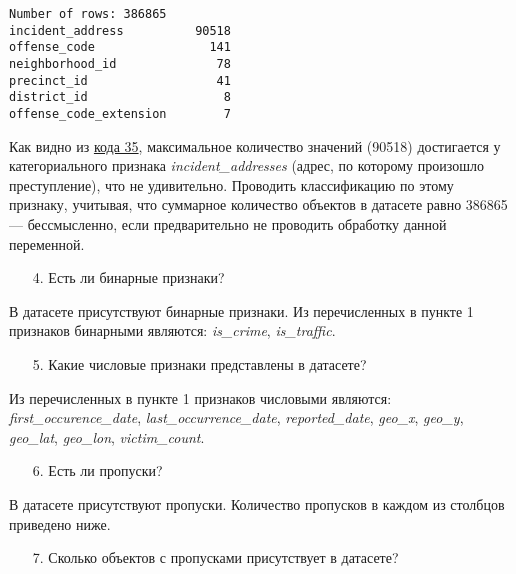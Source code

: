 \begin{code}
\begin{verbatim}
Number of rows: 386865
incident_address          90518
offense_code                141
neighborhood_id              78
precinct_id                  41
district_id                   8
offense_code_extension        7
\end{verbatim}
\label{code:35}
\end{code}

Как видно из \hyperref[code:35]{кода 35}, максимальное количество значений (90518) достигается у категориального признака \textit{incident\_addresses} (адрес, по которому произошло преступление), что не удивительно. Проводить классификацию по этому признаку, учитывая, что суммарное количество объектов в датасете равно 386865 --- бессмысленно, если предварительно не проводить обработку данной переменной.

\begin{enumerate}
    \item[4.] Есть ли бинарные признаки?
\end{enumerate}

В датасете присутствуют бинарные признаки. Из перечисленных в пункте 1 признаков бинарными являются: \textit{is\_crime}, \textit{is\_traffic}.

\begin{enumerate}
    \item[5.] Какие числовые признаки представлены в датасете?
\end{enumerate}

Из перечисленных в пункте 1 признаков числовыми являются: \textit{first\_occurence\_date}, \textit{last\_occurrence\_date}, \textit{reported\_date}, \textit{geo\_x}, \textit{geo\_y}, \textit{geo\_lat}, \textit{geo\_lon}, \textit{victim\_count}.

\begin{enumerate}
    \item[6.] Есть ли пропуски?
\end{enumerate}

В датасете присутствуют пропуски. Количество пропусков в каждом из столбцов приведено ниже.

\begin{enumerate}
    \item[7.] Сколько объектов с пропусками присутствует в датасете?
\end{enumerate}

